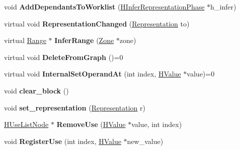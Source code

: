 \begin{DoxyCompactItemize}
\item 
void {\bfseries Add\+Dependants\+To\+Worklist} (\hyperlink{classv8_1_1internal_1_1_h_infer_representation_phase}{H\+Infer\+Representation\+Phase} $\ast$h\+\_\+infer)\hypertarget{classv8_1_1internal_1_1_h_value_a9d62aefb96a2813e8ed35b87fbef4a7a}{}\label{classv8_1_1internal_1_1_h_value_a9d62aefb96a2813e8ed35b87fbef4a7a}

\item 
virtual void {\bfseries Representation\+Changed} (\hyperlink{classv8_1_1internal_1_1_representation}{Representation} to)\hypertarget{classv8_1_1internal_1_1_h_value_a03b2d55c6c003ee3116423455cd604dd}{}\label{classv8_1_1internal_1_1_h_value_a03b2d55c6c003ee3116423455cd604dd}

\item 
virtual \hyperlink{classv8_1_1internal_1_1_range}{Range} $\ast$ {\bfseries Infer\+Range} (\hyperlink{classv8_1_1internal_1_1_zone}{Zone} $\ast$zone)\hypertarget{classv8_1_1internal_1_1_h_value_aafded10f81e80bbd2d2b52848476edf7}{}\label{classv8_1_1internal_1_1_h_value_aafded10f81e80bbd2d2b52848476edf7}

\item 
virtual void {\bfseries Delete\+From\+Graph} ()=0\hypertarget{classv8_1_1internal_1_1_h_value_a48e355e95c0d9c7e6620b92ecfe1312e}{}\label{classv8_1_1internal_1_1_h_value_a48e355e95c0d9c7e6620b92ecfe1312e}

\item 
virtual void {\bfseries Internal\+Set\+Operand\+At} (int index, \hyperlink{classv8_1_1internal_1_1_h_value}{H\+Value} $\ast$value)=0\hypertarget{classv8_1_1internal_1_1_h_value_a04561bfe2964422affeafae3c50e7f3f}{}\label{classv8_1_1internal_1_1_h_value_a04561bfe2964422affeafae3c50e7f3f}

\item 
void {\bfseries clear\+\_\+block} ()\hypertarget{classv8_1_1internal_1_1_h_value_a861273b417af7cf537b13e429d8a5576}{}\label{classv8_1_1internal_1_1_h_value_a861273b417af7cf537b13e429d8a5576}

\item 
void {\bfseries set\+\_\+representation} (\hyperlink{classv8_1_1internal_1_1_representation}{Representation} r)\hypertarget{classv8_1_1internal_1_1_h_value_ab865bf5ef1c94593216663bd940efc75}{}\label{classv8_1_1internal_1_1_h_value_ab865bf5ef1c94593216663bd940efc75}

\item 
\hyperlink{classv8_1_1internal_1_1_h_use_list_node}{H\+Use\+List\+Node} $\ast$ {\bfseries Remove\+Use} (\hyperlink{classv8_1_1internal_1_1_h_value}{H\+Value} $\ast$value, int index)\hypertarget{classv8_1_1internal_1_1_h_value_aed821fc32659ee9bfaf8bdf7744f2bdf}{}\label{classv8_1_1internal_1_1_h_value_aed821fc32659ee9bfaf8bdf7744f2bdf}

\item 
void {\bfseries Register\+Use} (int index, \hyperlink{classv8_1_1internal_1_1_h_value}{H\+Value} $\ast$new\+\_\+value)\hypertarget{classv8_1_1internal_1_1_h_value_aabc095efe342a2a7d7997a01124887d1}{}\label{classv8_1_1internal_1_1_h_value_aabc095efe342a2a7d7997a01124887d1}

\end{DoxyCompactItemize}
